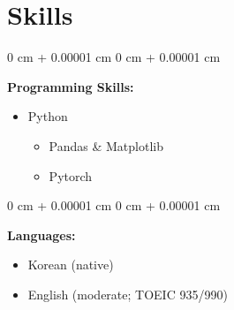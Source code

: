 \documentclass[10pt, letterpaper]{article}
\newenvironment{onecolentry}{
    \begin{adjustwidth}{
        0 cm + 0.00001 cm
    }{
        0 cm + 0.00001 cm
    }
}{
    \end{adjustwidth}
} %
\begin{document}
    \section{Skills}
        \begin{onecolentry}
            \textbf{Programming Skills:}
            \begin{itemize}
                \item Python
                \begin{itemize}
                    \item Pandas \& Matplotlib
                    \item Pytorch
                \end{itemize}
            \end{itemize}
        \end{onecolentry}
        \vspace{0.2 cm}
        \begin{onecolentry}
            \textbf{Languages:}
            \begin{itemize}
                \item Korean (native)
                \item English (moderate; TOEIC 935/990)
            \end{itemize}
        \end{onecolentry}
\end{document}
